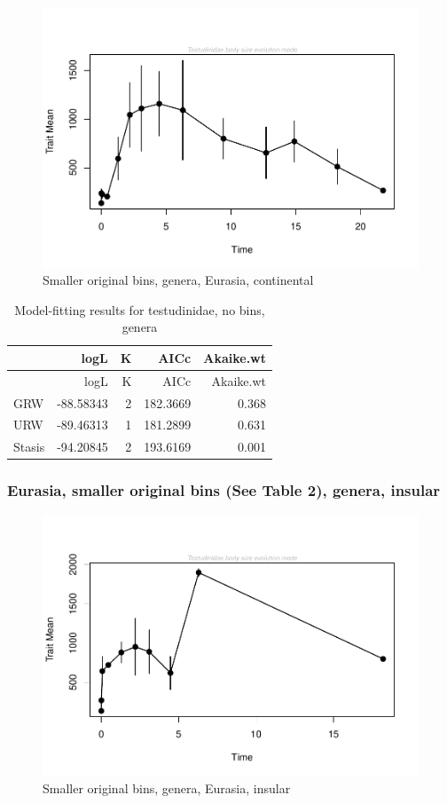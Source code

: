 \documentclass[]{article}
\begin{document}
\begin{figure}[htbp]
\centering
\includegraphics{MA_JJ_files/figure-latex/paleoTS with different time bins, no bins, genera, Eurasia, continental-1.pdf}
\caption{Smaller original bins, genera, Eurasia, continental}
\end{figure}

\begin{longtable}[]{@{}lrrrr@{}}
\caption{Model-fitting results for testudinidae, no bins,
genera}\tabularnewline
\toprule
& logL & K & AICc & Akaike.wt\tabularnewline
\midrule
\endfirsthead
\toprule
& logL & K & AICc & Akaike.wt\tabularnewline
\midrule
\endhead
GRW & -88.58343 & 2 & 182.3669 & 0.368\tabularnewline
URW & -89.46313 & 1 & 181.2899 & 0.631\tabularnewline
Stasis & -94.20845 & 2 & 193.6169 & 0.001\tabularnewline
\bottomrule
\end{longtable}

\newpage 

\subsubsection{Eurasia, smaller original bins (See Table 2), genera,
insular}\label{eurasia-smaller-original-bins-see-table-2-genera-insular}

\begin{figure}[htbp]
\centering
\includegraphics{MA_JJ_files/figure-latex/paleoTS with different time bins, no bins, genera, Eurasia, insular-1.pdf}
\caption{Smaller original bins, genera, Eurasia, insular}
\end{figure}
\end{document}
